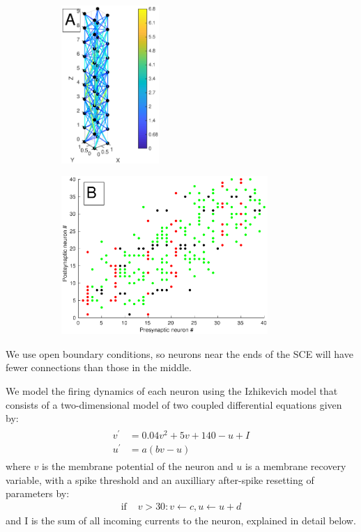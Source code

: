 \documentclass[12pt]{article}
\begin{document}
\begin{figure}[!htb]
 \caption{Example SCE with dimensions 2x2x10 (X/Y/Z), $\lambda$=2.5, and C=1. A) SCE showing connections between neurons as lines colored using a color scale that indicates the connection length. 
 B) Connection matrix. E-E connections are green, E-I are black and both I-E and I-I are red. 
 The labels of the neurons used in both axes are sequentially assigned starting at the bottom (Z=0).}
 \label{fig:column_structure}
 \begin{subfigure}{0.3\textwidth}
   \centering
   \includegraphics[height=60mm]{fig/column_structure_A}
 \end{subfigure}%
 \hfill
 \begin{subfigure}{0.7\textwidth}
   \centering
   \includegraphics[height=60mm]{fig/column_structure_B}
 \end{subfigure}%
 \hfill
\end{figure}
We use open boundary conditions, so neurons near the ends of the SCE will have fewer connections than those in the middle. 

We model the firing dynamics of each neuron using the Izhikevich model \parencite{izhikevich2003} that consists of a two-dimensional model of two coupled differential equations given by:
\begin{align}
 \begin{split}
  v^\prime &= 0.04v^2+5v+140-u+I \label{eq:neuron_v} \\
  u^\prime &= a(bv-u)
 \end{split}
\end{align}
where $v$ is the membrane potential of the neuron and $u$ is a membrane recovery variable, with a spike threshold and an auxilliary after-spike resetting of parameters by:
\begin{align}
  \text{if } &v>30: v\leftarrow c, u\leftarrow u+d
\end{align}
and I is the sum of all incoming currents to the neuron, explained in detail below. 
\end{document}
